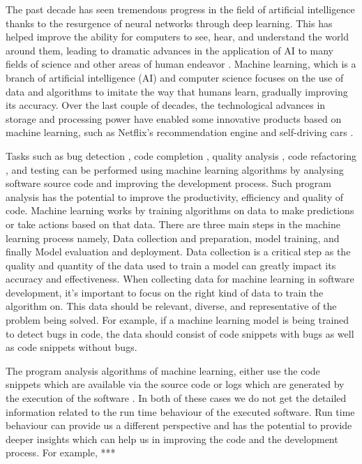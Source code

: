 The past decade has seen tremendous progress in the field of artificial intelligence thanks to the resurgence of neural networks through deep learning. This has helped improve the ability for computers to see, hear, and understand the world around them, leading to dramatic advances in the application of AI to many fields of science and other areas of human endeavor \cite{Machine_Learning_decade}. Machine learning, which is a branch of artificial intelligence (AI) and computer science focuses on the use of data and algorithms to imitate the way that humans learn, gradually improving its accuracy. Over the last couple of decades, the technological advances in storage and processing power have enabled some innovative products based on machine learning, such as Netflix’s recommendation engine and self-driving cars \cite{Machine_Learning}.

Tasks such as bug detection \cite{DeepBugs2018}, code completion \cite{code_completion}, quality analysis \cite{Code_analysis_1, Code_analysis_2}, code refactoring \cite{code_refactoring}, and testing \cite{testing_1, testing_2, testing_3} can be performed using machine learning algorithms by analysing software source code and improving the development process. Such program analysis has the potential to improve the productivity, efficiency and quality of code. Machine learning works by training algorithms on data to make predictions or take actions based on that data. There are three main steps in the machine learning process namely, Data collection and preparation, model training, and finally Model evaluation and deployment. Data collection is a critical step as the quality and quantity of the data used to train a model can greatly impact its accuracy and effectiveness. When collecting data for machine learning in software development, it's important to focus on the right kind of data to train the algorithm on. This data should be relevant, diverse, and representative of the problem being solved. For example, if a machine learning model is being trained to detect bugs in code, the data should consist of code snippets with bugs as well as code snippets without bugs.

The program analysis algorithms of machine learning, either use the code snippets which are available via the source code\cite{static_code_analysis} or logs which are generated by the execution of the software \cite{loglens}. In both of these cases we do not get the detailed information related to the run time behaviour of the executed software. Run time behaviour can provide us a different perspective and has the potential to provide deeper insights which can help us in improving the code and the development process. For example, ***

